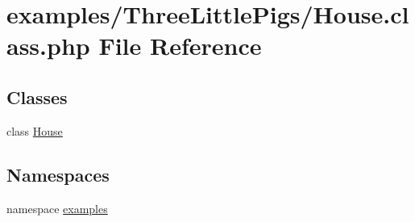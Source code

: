 \hypertarget{_house_8class_8php}{
\section{examples/ThreeLittlePigs/House.class.php File Reference}
\label{_house_8class_8php}
}
\subsection*{Classes}
\begin{CompactItemize}
\item 
class \hyperlink{class_house}{House}
\end{CompactItemize}
\subsection*{Namespaces}
\begin{CompactItemize}
\item 
namespace \hyperlink{namespaceexamples}{examples}
\end{CompactItemize}

